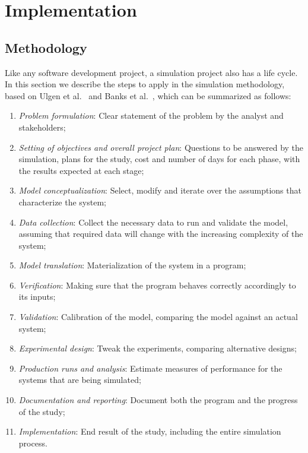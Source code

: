 \chapter{Implementation} \label{chap:implementation}

\section*{}


\section{Methodology} \label{sec:meth}

Like any software development project, a simulation project also has a life 
cycle. In this section we describe the steps to apply in the simulation 
methodology, based on Ulgen et al.~\cite{Ulgen1994} and Banks et 
al.~\cite[section 1.11]{Banks2004}, which can be summarized as follows:

\begin{enumerate}
    \item \textit{Problem formulation}: Clear statement of the problem by the 
    analyst and stakeholders; \label{enum:mform}
    \item \textit{Setting of objectives and overall project plan}: Questions to 
    be answered by the simulation, plans for the study, cost and number of days 
    for each phase, with the results expected at each stage; \label{enum:mobj}
    \item \textit{Model conceptualization}: Select, modify and iterate over the 
    assumptions that characterize the system; \label{enum:mconcept}
    \item \textit{Data collection}: Collect the necessary data to run and 
    validate the model, assuming that required data will change with the 
    increasing complexity of the system; \label{enum:mdata}
    \item \textit{Model translation}: Materialization of the system in a 
    program; \label{enum:mtransl}
    \item \textit{Verification}: Making sure that the program behaves correctly 
    accordingly to its inputs; \label{enum:mverif}
    \item \textit{Validation}: Calibration of the model, comparing the model 
    against an actual system; \label{enum:mvalid}
    \item \textit{Experimental design}: Tweak the experiments, comparing 
    alternative designs; \label{enum:mexp}
    \item \textit{Production runs and analysis}: Estimate measures of 
    performance for the systems that are being simulated; \label{enum:mprod}
    \item \textit{Documentation and reporting}: Document both the program and 
    the progress of the study; \label{enum:mdocs}
    \item \textit{Implementation}: End result of the study, including the 
    entire simulation process. \label{enum:mimpl}
\end{enumerate}

